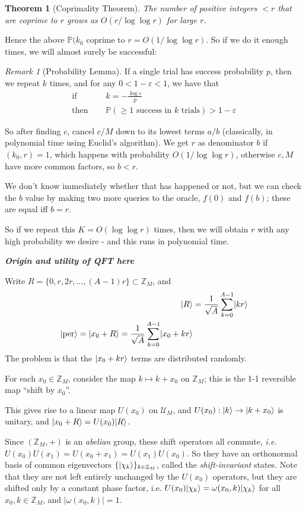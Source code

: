 \documentclass[]{article}
\DeclarePairedDelimiter\ket{\lvert}{\rangle}
\theoremstyle{custhm}
\theoremstyle{cusdef}
\theoremstyle{custhm}
\theoremstyle{custhm}
\theoremstyle{custhm}
\theoremstyle{custhm}
\newtheorem*{theorem*}{Theorem}
\theoremstyle{cusdef}
\theoremstyle{remark}
\newtheorem*{remark*}{Remark}
\newcommand{\Z}{\mathbb{Z}}
\newcommand{\ra}{\rightarrow}
\newcommand{\eps}{\varepsilon}
\renewcommand{\P}{\mathbb{P}}
\newcommand{\undf}[1]{\textit{\textbf{#1}}}
\renewcommand{\it}[1]{\textit{#1}}
\newcommand{\U}{\mathcal{U}}
\newcommand{\per}{\ket{\textrm{per}}}
\begin{document}
\begin{theorem*}[Coprimality Theorem]
The number of positive integers $<r$ that are coprime to $r$ grows as $O\left(r/\log\log r\right)$ for large $r$.
\end{theorem*}
Hence the above $\P(k_0 \textrm{ coprime to }r = O\left(1/\log\log r\right)$. So if we do it enough times, we will almost surely be successful:
	
\begin{remark*}[Probability Lemma]
If a single trial has success probability $p$, then we repeat $k$ times, and for any $0 < 1 - \eps < 1$, we have that
\begin{align*}
	\textrm{if }&\quad k= -\frac{\log \eps}{p}\\
	\textrm{then }&\quad\P(\ge 1 \textrm{ success in }k \textrm{ trials}) > 1 - \eps
\end{align*}
\end{remark*}
So after finding $c$, cancel $c/M$ down to its lowest terms $a/b$ (classically, in polynomial time using Euclid's algorithm). We get $r$ as denominator $b$ if $(k_0,r) = 1$, which happens with probability $O(1/\log\log r)$, otherwise $c,M$ have more common factors, so $b < r$.

We don't know immediately whether that has happened or not, but we can check the $b$ value by making two more queries to the oracle, $f(0)$ and $f(b)$; these are equal iff $b = r$.

So if we repeat this $K = O(\log\log r)$ times, then we will obtain $r$ with any high probability we desire - and this runs in polynomial time.

\undf{Origin and utility of QFT here}

Write $R = \{0,r,2r,\dots,(A-1)r\}\subset \Z_M$, and
\begin{align*}
\ket{R} &= \frac{1}{\sqrt{A}}\sum_{k=0}^{A-1}\ket{kr}\\
\per = \ket{x_0+R} = \frac{1}{\sqrt{A}}\sum_{k=0}^{A-1}\ket{x_0+kr}
\end{align*}
The problem is that the $\ket{x_0+kr}$ terms are distributed randomly.

For each $x_0\in\Z_M$, consider the map $k\mapsto k+x_0$ on $\Z_M$; this is the 1-1 reversible map ``shift by $x_0$''.

This gives rise to a linear map $U(x_0)$ on $\U_M$, and $U(x_0):\ket{k}\ra\ket{k+x_0}$ is unitary, and $\ket{x_0+R} = U(x_0)\ket{R}$.

Since $(\Z_M,+)$ is an \it{abelian} group, these shift operators all commute, \it{i.e.} $U(x_0)U(x_1) = U(x_0+x_1) = U(x_1)U(x_0)$. So they have an orthonormal basis of common eigenvectors $\{\ket{\chi_k}\}_{k\in\Z_M}$, called the \it{shift-invariant} states. Note that they are not left entirely unchanged by the $U(x_0)$ operators, but they are shifted only by a constant phase factor, \textrm{i.e.} $U(x_0)\ket{\chi_k} = \omega(x_0,k)\ket{\chi_k}$ for all $x_0,k\in\Z_M$, and $|\omega(x_0,k)| = 1$.
\end{document}
